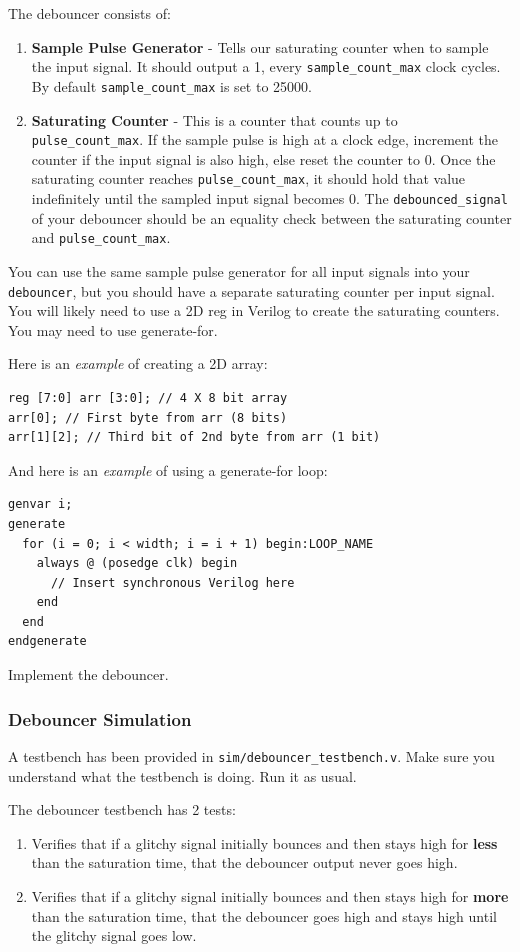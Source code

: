 \documentclass[11pt]{article}
\begin{document}
The debouncer consists of:
\begin{enumerate}
  \item \textbf{Sample Pulse Generator} - Tells our saturating counter when to sample the input signal. It should output a 1, every \verb|sample_count_max| clock cycles. By default \verb|sample_count_max| is set to 25000.
  \item \textbf{Saturating Counter} - This is a counter that counts up to \verb|pulse_count_max|.
    If the sample pulse is high at a clock edge, increment the counter if the input signal is also high, else reset the counter to 0.
    Once the saturating counter reaches \verb|pulse_count_max|, it should hold that value indefinitely until the sampled input signal becomes 0.
    The \verb|debounced_signal| of your debouncer should be an equality check between the saturating counter and \verb|pulse_count_max|.
\end{enumerate}

You can use the same sample pulse generator for all input signals into your \verb|debouncer|, but you should have a separate saturating counter per input signal.
You will likely need to use a 2D reg in Verilog to create the saturating counters. You may need to use generate-for.

Here is an \textit{example} of creating a 2D array:

\begin{verbatim}
reg [7:0] arr [3:0]; // 4 X 8 bit array
arr[0]; // First byte from arr (8 bits)
arr[1][2]; // Third bit of 2nd byte from arr (1 bit)
\end{verbatim}

And here is an \textit{example} of using a generate-for loop:
\begin{verbatim}
genvar i;
generate
  for (i = 0; i < width; i = i + 1) begin:LOOP_NAME
    always @ (posedge clk) begin
      // Insert synchronous Verilog here
    end
  end
endgenerate
\end{verbatim}
Implement the debouncer.

\subsubsection{Debouncer Simulation}
A testbench has been provided in \verb|sim/debouncer_testbench.v|. Make sure you understand what the testbench is doing. Run it as usual.

The debouncer testbench has 2 tests:
\begin{enumerate}
  \item Verifies that if a glitchy signal initially bounces and then stays high for \textbf{less} than the saturation time, that the debouncer output never goes high.
  \item Verifies that if a glitchy signal initially bounces and then stays high for \textbf{more} than the saturation time, that the debouncer goes high and stays high until the glitchy signal goes low.
\end{enumerate}
\end{document}
